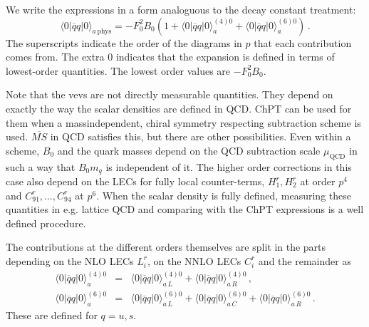 \documentclass[12pt,a4paper]{article}
\begin{document}
We write the expressions in a form analoguous to the decay constant
treatment:
\begin{equation}
\langle0\vert \overline q q \vert 0\rangle_{a\,\mathrm{phys}} =
- F_0^2 B_0\left(1+\langle0\vert \overline q q \vert 0\rangle_a^{(4)0}+
\langle0\vert \overline q q \vert 0\rangle_a^{(6)0}\right)\,.
\end{equation}
The superscripts indicate the order of the diagrams in $p$ that each
contribution comes from. The extra $0$ indicates that the expansion
is defined in terms of lowest-order quantities.
The lowest order values are $-F_0^2 B_0$.

Note that the vevs are not directly measurable quantities. They depend
on exactly the way the scalar densities are defined in QCD. ChPT can be
used for them when a massindependent, chiral symmetry respecting subtraction
scheme is used. $\overline{MS}$ in QCD satisfies this, but there are other
possibilities. Even within a scheme, $B_0$ and the quark masses depend
on the QCD subtraction scale $\mu_\textrm{QCD}$ in such a way that
$B_0 m_q$ is independent of it. The higher order corrections in this
case also depend on the LECs for fully local counter-terms,
$H_1^r,H_2^r$ at order $p^4$ and $C_{91}^r,\ldots,C_{94}^r$ at $p^6$.
When the scalar density is fully defined, measuring these quantities in
e.g. lattice QCD and comparing with the ChPT expressions is a well defined
procedure.

The contributions at the different orders themselves are split in the parts
depending on the NLO LECs $L_i^r$, on the NNLO LECs $C_i^r$ and the
remainder as
\begin{eqnarray}
\label{defvevlo}
\langle0\vert \overline q q \vert 0\rangle_a^{(4)0}&=&
\langle0\vert \overline q q \vert 0\rangle_{a\,L}^{(4)0}
+\langle0\vert \overline q q \vert 0\rangle_{a\,R}^{(4)0}\,,
\nonumber\\
\langle0\vert \overline q q \vert 0\rangle_a^{(6)0}&=&
\langle0\vert \overline q q \vert 0\rangle_{a\,L}^{(6)0}
+\langle0\vert \overline q q \vert 0\rangle_{a\,C}^{(6)0}
+\langle0\vert \overline q q \vert 0\rangle_{a\,R}^{(6)0}\,.
\end{eqnarray}
These are defined for $q=u,s$.\\
\end{document}
